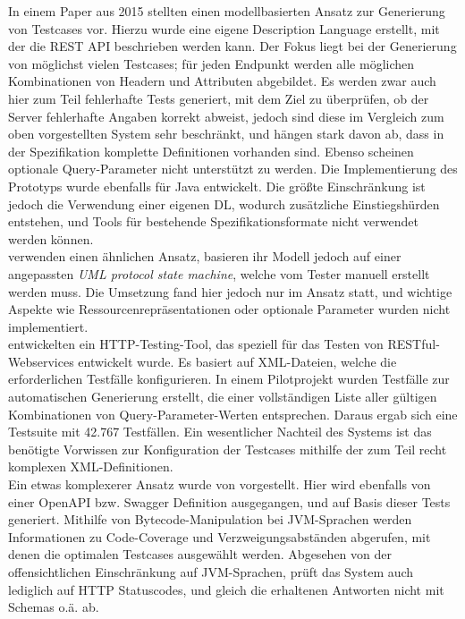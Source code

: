 In einem Paper aus 2015 stellten \textcite{fertig2015model} einen modellbasierten Ansatz zur Generierung von Testcases vor. Hierzu wurde eine eigene Description Language erstellt, mit der die REST API beschrieben werden kann. Der Fokus liegt bei der Generierung von möglichst vielen Testcases; für jeden Endpunkt werden alle möglichen Kombinationen von Headern und Attributen abgebildet. Es werden zwar auch hier zum Teil fehlerhafte Tests generiert, mit dem Ziel zu überprüfen, ob der Server fehlerhafte Angaben korrekt abweist, jedoch sind diese im Vergleich zum oben vorgestellten System sehr beschränkt, und hängen stark davon ab, dass in der Spezifikation komplette Definitionen vorhanden sind. Ebenso scheinen optionale Query-Parameter nicht unterstützt zu werden. Die Implementierung des Prototyps wurde ebenfalls für Java entwickelt. Die größte Einschränkung ist jedoch die Verwendung einer eigenen DL, wodurch zusätzliche Einstiegshürden entstehen, und Tools für bestehende Spezifikationsformate nicht verwendet werden können.\\

\textcite{pinheiro2013model} verwenden einen ähnlichen Ansatz, basieren ihr Modell jedoch auf einer angepassten \emph{UML protocol state machine}, welche vom Tester manuell erstellt werden muss. Die Umsetzung fand hier jedoch nur im Ansatz statt, und wichtige Aspekte wie Ressourcenrepräsentationen oder optionale Parameter wurden nicht implementiert.\\

\textcite{chakrabarti2009test} entwickelten ein HTTP-Testing-Tool, das speziell für das Testen von RESTful-Webservices entwickelt wurde. Es basiert auf XML-Dateien, welche die erforderlichen Testfälle konfigurieren. In einem Pilotprojekt wurden Testfälle zur automatischen Generierung erstellt, die einer vollständigen Liste aller gültigen Kombinationen von Query-Parameter-Werten entsprechen. Daraus ergab sich eine Testsuite mit 42.767 Testfällen. Ein wesentlicher Nachteil des Systems ist das benötigte Vorwissen zur Konfiguration der Testcases mithilfe der zum Teil recht komplexen XML-Definitionen. \\

Ein etwas komplexerer Ansatz wurde von \textcite{arcuri2017restful} vorgestellt. Hier wird ebenfalls von einer OpenAPI bzw. Swagger Definition ausgegangen, und auf Basis dieser Tests generiert. Mithilfe von Bytecode-Manipulation bei JVM-Sprachen werden Informationen zu Code-Coverage und Verzweigungsabständen abgerufen, mit denen die optimalen Testcases ausgewählt werden. Abgesehen von der offensichtlichen Einschränkung auf JVM-Sprachen, prüft das System auch lediglich auf HTTP Statuscodes, und gleich die erhaltenen Antworten nicht mit Schemas o.ä. ab. \\

